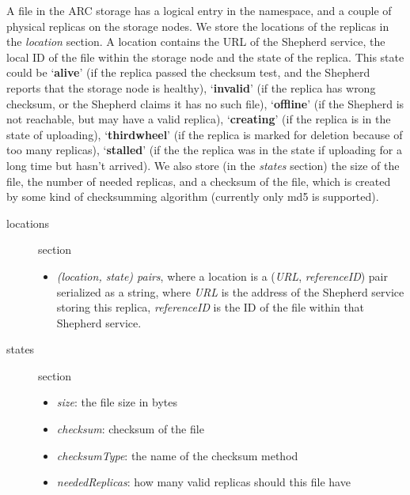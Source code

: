 \documentclass{book}
\begin{document}
A file in the ARC storage has a logical entry in the namespace, and a couple of physical replicas on the storage nodes. We store the locations of the replicas in the \emph{location} section. A location contains the URL of the Shepherd service, the local ID of the file within the storage node and the state of the replica. This state could be `\textbf{alive}' (if the replica passed the checksum test, and the Shepherd reports that the storage node is healthy), `\textbf{invalid}' (if the replica has wrong checksum, or the Shepherd claims it has no such file), `\textbf{offline}' (if the Shepherd is not reachable, but may have a valid replica), `\textbf{creating}' (if the replica is in the state of uploading), `\textbf{thirdwheel}' (if the replica is marked for deletion because of too many replicas), `\textbf{stalled}' (if the the replica was in the state if uploading for a long time but hasn't arrived). We also store (in the \emph{states} section) the size of the file, the number of needed replicas, and a checksum of the file, which is created by some kind of checksumming algorithm (currently only md5 is supported).

\begin{description}
    \item [locations] section 
    \begin{itemize}
        \item \emph{(location, state) pairs}, where a location is a (\emph{URL}, \emph{referenceID}) pair serialized as a string, where \emph{URL} is the address of the Shepherd service storing this replica, \emph{referenceID} is the ID of the file within that Shepherd service.
    \end{itemize}
    \item [states] section 
    \begin{itemize}
        \item \emph{size}: the file size in bytes
        \item \emph{checksum}: checksum of the file
        \item \emph{checksumType}: the name of the checksum method
        \item \emph{neededReplicas}: how many valid replicas should this file have 
    \end{itemize}
\end{description}




\end{document}
